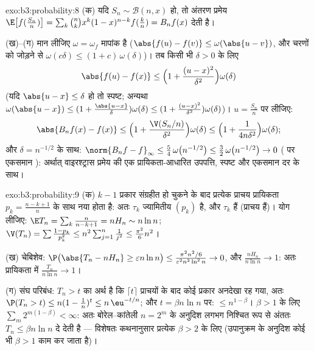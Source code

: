 \begin{solution}{exo:b3:probability:8}
(क) यदि $S_n \sim \mathcal B(n, x)$ हो, तो अंतरण प्रमेय
$\E\bigl[f(\frac{S_n}n)\bigr] =
\sum_k\binom nkx^k(1-x)^{n-k}f(\frac kn) = B_nf(x)$ देती है।

(ख)--(ग) मान लीजिए $\omega = \omega_f$  मापांक है
($\abs{f(u) - f(v)} \leq \omega(\abs{u - v})$, और चरणों को
जोड़ने से $\omega(c
\delta) \leq (1 + c)\,\omega(\delta)$)। तब किसी भी $\delta >
0$ के लिए
\[
\abs{f(u) - f(x)} \leq \Bigl(1 + \frac{(u -
x)^2}{\delta^2}\Bigr)\omega(\delta)
\]
(यदि $\abs{u - x} \leq \delta$ हो तो स्पष्ट; अन्यथा
$\omega(\abs{u-x}) \leq (1 + \frac{\abs{u-x}}\delta)
\omega(\delta) \leq (1 + \frac{(u-x)^2}{\delta^2})
\omega(\delta)$)। $u = \frac{S_n}n$ पर  लीजिए:
\[
\abs{B_nf(x) - f(x)} \leq
\Bigl(1 + \frac{\V(S_n/n)}{\delta^2}\Bigr)\omega(\delta)
\leq \Bigl(1 + \frac{1}{4n\delta^2}\Bigr)\omega(\delta) ;
\]
और $\delta = n^{-1/2}$ के साथ: $\norm{B_nf - f}_\infty \leq
\frac54\,\omega\bigl(n^{-1/2}\bigr) \leq
\frac32\,\omega\bigl(n^{-1/2}\bigr) \to 0$ ( पर एकसमान
): अर्थात् वाइरश्ट्रास प्रमेय की एक प्रायिकता-आधारित
उपपत्ति, स्पष्ट और एकसमान दर के साथ।
\end{solution}

\begin{solution}{exo:b3:probability:9}
(क) $k - 1$ प्रकार संग्रहीत हो चुकने के बाद प्रत्येक प्राचय
प्रायिकता $p_k = \frac{n-k+1}n$ के साथ नया होता है: अतः
$\tau_k$ ज्यामितीय $(p_k)$ है, और $\tau_k$  हैं
(प्राचय  हैं)। योग लीजिए: $\E T_n =
\sum_k\frac n{n-k+1} = nH_n \sim n\ln n$;
$\V(T_n) = \sum\frac{1 - p_k}{p_k^2} \leq
n^2\sum_{j=1}^n\frac1{j^2} \leq \frac{\pi^2}6n^2$।

(ख) चेबिशेव: $\P\bigl(\abs{T_n - nH_n} \geq \varepsilon
n\ln n\bigr) \leq \frac{\pi^2n^2/6}{\varepsilon^2n^2\ln^2n}
\to 0$, और $\frac{nH_n}{n\ln n} \to 1$: अतः प्रायिकता में
$\frac{T_n}{n\ln n} \to 1$।

(ग) संघ परिबंध: $T_n > t$ का अर्थ है कि $\lceil t\rceil$
प्राचयों के बाद कोई प्रकार अनदेखा रह गया, अतः $\P(T_n > t)
\leq n(1 - \frac1n)^{t} \leq n\,\eu^{-t/n}$; और $t = \beta
n\ln n$ पर: $\leq n^{1 - \beta}$। $\beta > 1$ के लिए $\sum_m
2^{m(1-\beta)} < \infty$: अतः बोरेल--कांतेली $n = 2^m$ के
अनुदिश लगभग निश्चित रूप से अंततः $T_n \leq \beta n\ln n$ दे
देती है --- विशेषतः कथनानुसार प्रत्येक $\beta > 2$ के लिए
(उपानुक्रम के अनुदिश कोई भी $\beta > 1$ काम कर जाता है)।
\end{solution}

